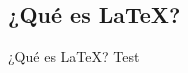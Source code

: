 \documentclass[../slides.tex]{subfiles}
\begin{document}
    \begin{frame}
    \tableofcontents[sections=\value{section}]
    \end{frame}

    \subsection{¿Qué es \LaTeX{}?}
        
    \begin{frame}{¿Qué es \LaTeX{}?}
        Test
    \end{frame}

    \subsection{}
\end{document}
